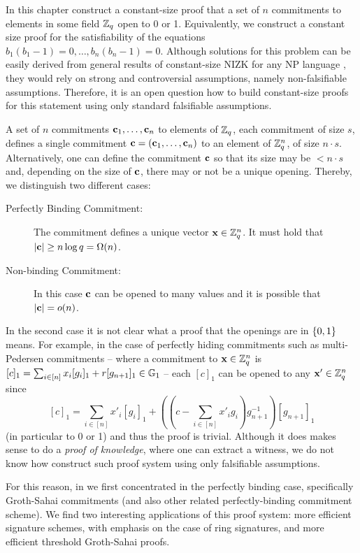 In this chapter construct a {constant-size proof} that a set of $n$ commitments to elements in some field $\mathbb{Z}_q$ open to 0 or 1. Equivalently, we construct a constant size proof for the satisfiability of the equations $b_1(b_1-1)=0,\ldots,b_n(b_n-1)=0$.
Although solutions for this problem can be easily derived from general results of constant-size NIZK for any NP language \cite{EC:GGPR13,AC:DFGK14,EC:Groth16}, they would rely on strong and controversial assumptions, namely non-falsifiable assumptions. Therefore, it is an open question how to build constant-size proofs for this statement using only standard falsifiable assumptions. 

A set of $n$ commitments $\mathbf{c}_1,\ldots,\mathbf{c}_n$ to elements of $\mathbb{Z}_q$, each commitment of size $s$, defines a single commitment $\mathbf{c}=(\mathbf{c}_1,\ldots,\mathbf{c}_n)$ to an element of $\mathbb{Z}_q^n$, of size $n\cdot s$. Alternatively, one can define the commitment $\mathbf{c}$ so that its size may be $<n\cdot s$ and, depending on the size of $\mathbf{c}$, there may or not be a unique opening. Thereby, we distinguish two different cases:

\begin{description}
\item[Perfectly Binding Commitment:] The commitment defines a unique vector $\mathbf{x}\in\mathbb{Z}_q^n$. It must hold that $|\mathbf{c}|\geq n\log q = \Omega(n)$.
\item[Non-binding Commitment:] In this case $\mathbf{c}$ can be opened to many values and it is possible that $|\mathbf{c}|= o(n)$.
\end{description}

In the second case it is not clear what a proof that the openings are in $\{0,1\}$ means. For example, in the case of perfectly hiding commitments such as {multi-Pedersen} commitments -- where a commitment to $\mathbf{x}\in\mathbb{Z}_q^n$ is $[c]_1=\sum_{i\in[n]}x_i[g_i]_1+r[g_{n+1}]_1\in\mathbb{G}_1$ -- each $[c]_1$ can be opened to any $\mathbf{x}'\in\mathbb{Z}_q^n$ since
$$[c]_1=\sum_{i\in[n]}x'_i[g_i]_1+\left(\left(c-\sum_{i\in[n]}x'_ig_i\right)g_{n+1}^{-1}\right)[g_{n+1}]_1$$
(in particular to 0 or 1) and thus the proof is trivial. Although it does makes sense to do a \emph{proof of knowledge}, where one can extract a witness, we do not know how construct such proof system using only falsifiable assumptions.

For this reason, in \cite{AC:GonHevRaf15} we first concentrated in the perfectly binding case, specifically Groth-Sahai commitments (and also other related perfectly-binding commitment scheme). We find two interesting applications of this proof system: more efficient signature schemes, with emphasis on the case of {ring signatures}, and more efficient {threshold Groth-Sahai proofs}.
 
